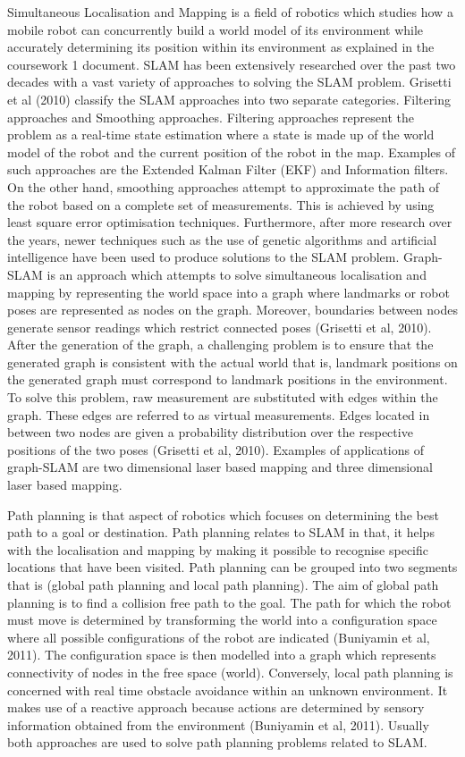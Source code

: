 \documentclass[a4paper, 12pt]{article}
\begin{document}
Simultaneous Localisation and Mapping is a field of robotics which studies how a mobile robot can concurrently build a world model of its environment while accurately determining its position within its environment as explained in the coursework 1 document. SLAM has been extensively researched over the past two decades with a vast variety of approaches to solving the SLAM problem. Grisetti et al (2010) classify the SLAM approaches into two separate categories. Filtering approaches and Smoothing approaches. Filtering approaches represent the problem as a real-time state estimation where a state is made up of the world model of the robot and the current position of the robot in the map. Examples of such approaches are the Extended Kalman Filter (EKF) and Information filters. On the other hand, smoothing approaches attempt to approximate the path of the robot based on a complete set of measurements. This is achieved by using least square error optimisation techniques. Furthermore, after more research over the years, newer techniques such as the use of genetic algorithms and artificial intelligence have been used to produce solutions to the SLAM problem. Graph-SLAM is an approach which attempts to solve simultaneous localisation and mapping by representing the world space into a graph where landmarks or robot poses are represented as nodes on the graph. Moreover, boundaries between nodes generate sensor readings which restrict connected poses (Grisetti et al, 2010). After the generation of the graph, a challenging problem is to ensure that the generated graph is consistent with the actual world that is, landmark positions on the generated graph must correspond to landmark positions in the environment. To solve this problem, raw measurement are substituted with edges within the graph. These edges are referred to as virtual measurements. Edges located in between two nodes are given a probability distribution over the respective positions of the two poses (Grisetti et al, 2010). Examples of applications of graph-SLAM are two dimensional laser based mapping and three dimensional laser based mapping.

\parskip=0.2in
Path planning is that aspect of robotics which focuses on determining the best path to a goal or destination. Path planning relates to SLAM in that, it helps with the localisation and mapping by making it possible to recognise specific locations that have been visited. Path planning can be grouped into two segments that is (global path planning and local path planning). The aim of global path planning is to find a collision free path to the goal. The path for which the robot must move is determined by transforming the world into a configuration space where all possible configurations of the robot are indicated (Buniyamin et al, 2011). The configuration space is then modelled into a graph which represents connectivity of nodes in the free space (world). Conversely, local path planning is concerned with real time obstacle avoidance within an unknown environment. It makes use of a reactive approach because actions are determined by sensory information obtained from the environment (Buniyamin et al, 2011). Usually both approaches are used to solve path planning problems related to SLAM.
 
\end{document}
